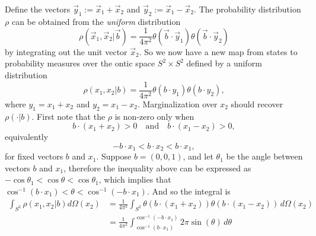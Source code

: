 \documentclass[12pt,draft]{article}
\theoremstyle{definition}
\theoremstyle{plain}
\begin{document}
    Define the vectors $\vec y_1 := \vec x_1 + \vec x_2$ and
    $\vec y_2 := \vec x_1 - \vec x_2$.  The probability
    distribution $\rho$ can be obtained from the
    \textit{uniform} distribution
    \begin{equation}
        \rho(\vec x_1, \vec x_2 | \vec b)
        = \frac{1}{4\pi^2} \theta(\vec b \cdot \vec y_1)
        \theta(\vec b \cdot \vec y_2)
    \end{equation}
    by integrating out the unit vector $\vec x_2$. 
    {
        \color{red}
        So we now have a new map from states to probability
        measures over the ontic space $S^2 \times S^2$
        defined by a uniform distribution
        \begin{equation}
            \rho(x_1,x_2 | b)
            = \frac{1}{4\pi^2} \theta(b \cdot y_1) \theta(b
            \cdot y_2),
        \end{equation}
        where $y_1 = x_1 + x_2$ and $y_2 = x_1 - x_2$.
        Marginalization over $x_2$ should recover
        $\rho(\cdot | b)$. First note that the $\rho$ is
        non-zero only when
        \begin{equation}
            b \cdot (x_1 + x_2) > 0
            \quad\text{and}\quad
            b \cdot (x_1 - x_2) > 0,
        \end{equation}
        equivalently
        \begin{equation}
            -b \cdot x_1 < b \cdot x_2 < b \cdot x_1,
        \end{equation}
        for fixed vectors $b$ and $x_1$. Suppose $b =
        (0,0,1)$, and let $\theta_1$ be the angle between
        vectors $b$ and $x_1$, therefore the inequality
        above can be expressed as $-\cos\theta_1 <
        \cos\theta < \cos\theta_1$, which implies that
        $\cos^{-1}(b \cdot x_1) < \theta <
        \cos^{-1}(-b \cdot x_1)$. And so the integral is
        \begin{align}
            \int_{S^2} \rho(x_1,x_2|b) d\Omega(x_2) 
            &= \frac{1}{4\pi^2} \int_{S^2} 
            \theta(b \cdot (x_1 + x_2)) \theta(b \cdot (x_1
            - x_2)) \, d\Omega(x_2) \\
            &= \frac{1}{4\pi^2}
            \int_{\cos^{-1}(b \cdot x_1)}^{\cos^{-1}(-b
            \cdot x_1)}
            2\pi \sin(\theta) \, d\theta \\

\end{align}}
\end{document}
